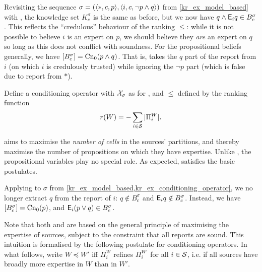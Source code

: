 \begin{example}
    \label{kr_ex_conditioning_operator}
    Revisiting the sequence
    $
        \sigma
        = (\langle {\ast, c, p} \rangle, \langle {i, c, \neg p \land q} \rangle)
    $
    from \cref{kr_ex_model_based} with \varbasedcond{}, the knowledge set
    $K^\sigma_c$ is the same as before, but we now have $q \land \mathsf{E}_i{q} \in
    B^\sigma_c$. This reflects the ``credulous'' behaviour of the ranking
    $\le$: while it is not possible to believe $i$ is an expert on $p$, we
    should believe they \emph{are} an expert on $q$ so long as this does not
    conflict with soundness. For the propositional beliefs generally, we have
    $\left[{B^\sigma_c}\right] = \operatorname{Cn}_0(p \land q)$. That is, \varbasedcond{} takes
    the $q$ part of the report from $i$ (on which $i$ is credulously trusted)
    while ignoring the $\neg p$ part (which is false due to report from
    $\ast$).

\end{example}

\begin{definition}
    Define a conditioning operator \partbasedcond{} with $\mathcal{X}_\sigma$ as
    for \varbasedcond{}, and $\le$ defined by the ranking function
    \[
        r(W) = -\sum_{i \in \mathcal{S}}{|\Pi^W_i|}.
    \]
\end{definition}

\partbasedcond{} aims to maximise the \emph{number of cells} in the sources'
partitions, and thereby maximise the number of propositions on which they have
expertise. Unlike \varbasedcond{}, the propositional variables play no special
role. As expected, \partbasedcond{} satisfies the basic postulates.

\begin{example}
    Applying \partbasedcond{} to $\sigma$ from
    \cref{kr_ex_model_based,kr_ex_conditioning_operator}, we no longer extract $q$
    from the report of $i$: $q \notin B^\sigma_c$ and $\mathsf{E}_i{q} \notin
    B^\sigma_c$. Instead, we have $\left[{B^\sigma_c}\right] = \operatorname{Cn}_0(p)$, and
    $\mathsf{E}_i(p \lor q) \in B^\sigma_c$.
\end{example}

Note that both \varbasedcond{} and \partbasedcond{} are based on the general
principle of maximising the expertise of sources, subject to the constraint
that all reports are sound. This intuition is formalised by the following
postulate for conditioning operators. In what follows, write $W \preceq W'$ iff
$\Pi^W_i$ refines $\Pi^{W'}_i$ for all $i \in \mathcal{S}$, i.e. if all sources have
broadly more expertise in $W$ than in $W'$.\footnotemark{}

